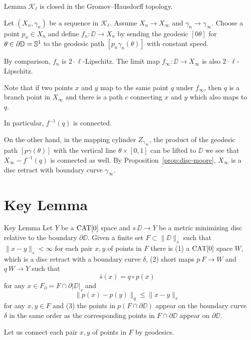 \documentclass{article}
\begin{document}
\begin{thm}{Lemma}\label{lem:closed}
$\mathcal{K}_\ell$ is closed in the Gromov--Hausdorff topology.
\end{thm}

Let $(X_n,\gamma_n)$ be a sequence in $\mathcal{K}_\ell$.
Assume $X_n\to X_\infty$ and $\gamma_n\to\gamma_\infty$. 
Choose a point $p_n\in X_n$ and define
$f_n:\DD\to X_n$ by sending the geodesic $[0\theta]$ for $\theta\in\partial \mathbb{D}=\mathbb{S}^1$ to the geodesic path $[p_n\gamma_n(\theta)]$ with constant speed. 

By comparison, $f_n$ is $2\cdot\ell$-Lipschitz. %
The limit map $f_\infty:\DD\to X_\infty$ is also $2\cdot\ell$-Lipschitz.

Note that if two points $x$  and $y$ map to the same point $q$ under $f_\infty$, then $q$ is a branch point in $X_\infty$ and there is a path $c$ connecting 
$x$ and $y$ which also maps to $q$. 

In particular, $f^{-1}(q)$ is connected.

On the other hand, in the mapping cylinder $Z_{\gamma_{\infty}}$, the product of the geodesic path $[p\gamma(\theta)]$ with the vertical line $\theta\times [0,1]$ can be lifted to  $\DD$ we see that $X_\infty-f^{-1}(q)$
is connected as well.
By Proposition~\ref{prop:disc-moore}, $X_\infty$ is a disc retract with boundary curve $\gamma_\infty$.
\qeds


\section{Key Lemma}\label{Key Lemma}


\begin{thm}{Key Lemma}\label{lem:key}
Let $Y$ be a $\mathop{\rm CAT}\nolimits[0]$ space and $s\:\DD\to Y$ 
be a metric minimizing disc relative to the boundary $\partial \DD$.
Given a finite set $F\subset \|\DD\|_s$ such that $\|x-y\|_s<\infty$ for each pair $x,y$ of points in $F$
there is 
(1) a $\mathop{\rm CAT}\nolimits[0]$ space $W$, which is a disc retract with a boundary curve $\delta$,
(2) short maps $p\:F\to W$ and $q\:W\to Y$ such that
\[\bar s(x)=q\circ p(x)\] 
for any $x\in F_{\partial}=F\cap \partial |\DD|_s$
and 
\[\|p(x)-p(y)\|_q\le \|x-y\|_s\] 
for any $x,y\in F$
and (3) the points in $p(F\cap\partial\DD)$ appear on the boundary curve $\delta$ in the same order as the corresponding points in $F\cap\partial\DD$ appear on $\partial\DD$.
\end{thm} 

Let us connect each pair $x,y$ of points in $F$ by geodesics.
\end{document}
